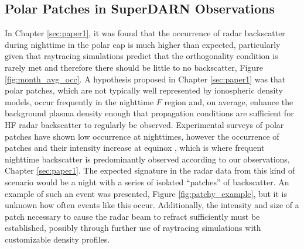\subsection{Polar Patches in SuperDARN Observations}
\label{sec:fw_patches}
In Chapter \ref{sec:paper1}, it was found that the occurrence of radar backscatter during nighttime in the polar cap is much higher than expected, particularly given that raytracing simulations predict that the orthogonality condition is rarely met and therefore there should be little to no backscatter, Figure \ref{fig:month_avg_occ}.  A hypothesis proposed in Chapter \ref{sec:paper1} was that polar patches, which are not typically well represented by ionospheric density models, occur frequently in the nighttime \(F\) region and, on average, enhance the background plasma density enough that propagation conditions are sufficient for HF radar backscatter to regularly be observed.  Experimental surveys of polar patches have shown low occurrence at nighttimes, however the occurrence of patches and their intensity increase at equinox \citep{Rodger1996}, which is where frequent nighttime backscatter is predominantly observed according to our observations, Chapter \ref{sec:paper1}.  The expected signature in the radar data from this kind of scenario would be a night with a series of isolated ``patches'' of backscatter.  An example of such an event was presented, Figure \ref{fig:patchy_example}, but it is unknown how often events like this occur.  Additionally, the intensity and size of a patch necessary to cause the radar beam to refract sufficiently must be established, possibly through further use of raytracing simulations with customizable density profiles.

